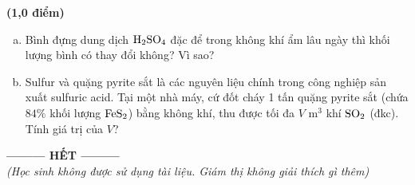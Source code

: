 \documentclass[12pt,a4paper]{article}
\begin{document}
\begin{ex}
\textbf{(1,0 điểm)}
\begin{enumerate}[a)]
	\item Bình đựng dung dịch $\ce{H2SO4}$ đặc để trong không khí ẩm lâu ngày thì khối lượng bình có thay đổi không? Vì sao?
	\item Sulfur và quặng pyrite sắt là các nguyên liệu chính trong công nghiệp sản xuất sulfuric acid. Tại một nhà máy, cứ đốt cháy 1 tấn quặng pyrite sắt (chứa $84\%$ khối lượng $\ce{FeS2}$) bằng không khí, thu được tối đa $V\text{ m}^3$ khí $\ce{SO2}$ (đkc). Tính giá trị của $V$?
\end{enumerate}
\loigiai{}
\vspace*{4.5cm}
\end{ex}

\begin{center}
\textbf{--------- HẾT ---------}\\
\textit{(Học sinh không được sử dụng tài liệu. Giám thị không giải thích gì thêm)}
\end{center}
\end{document}
